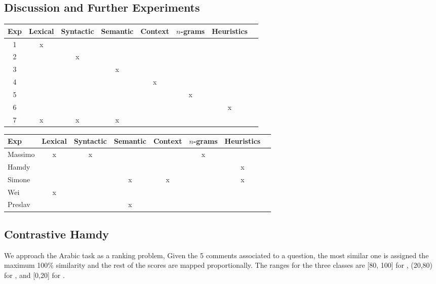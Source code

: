\subsection{Discussion and Further Experiments} \label{sec:expdiscussion}


\begin{table*}
\begin{tabular}{|c|c|c|c|c|c|c|c|}
\hline
Exp&Lexical & Syntactic & Semantic & Context & $n$-grams & Heuristics\\ 
\hline
1	& x	& 	& 	& 	& 	& 		\\
2	& 	& x	& 	& 	& 	& 		\\
3	& 	& 	& x	& 	& 	& 		\\
4	& 	& 	& 	& x	& 	& 		\\
5	& 	& 	& 	& 	& x	& 		\\
6	& 	& 	& 	& 	& 	& x		\\
7	& x	& x	& x	& 	& 	& 	 	\\
\hline
\end{tabular}



\begin{tabular}{|l|c|c|c|c|c|c|c|}
\hline
Exp	&Lexical & Syntactic & Semantic & Context & $n$-grams & Heuristics\\ 
\hline
Massimo	& x	& x	& 	& 	& x	& 		\\
Hamdy	& 	& 	& 	& 	& 	& x		\\
Simone	& 	& 	& x	& x	& 	& x		\\
Wei	& x	& 	& 	& 	& 	& 		\\
Preslav	& 	& 	& x	& 	& 	& 		\\

\hline
\end{tabular}



\caption{Experiments with features subsets.} 
 
 
 
\end{table*}



\subsection{Contrastive Hamdy}

We approach the Arabic task as a ranking problem, Given the 5 comments 
associated to a question, the most similar one is assigned the maximum 100\% 
similarity and the rest of the scores are mapped proportionally. The ranges 
for the three classes are [80, 100] for \dir, (20,80) for \rel, and [0,20] 
for \irel.

